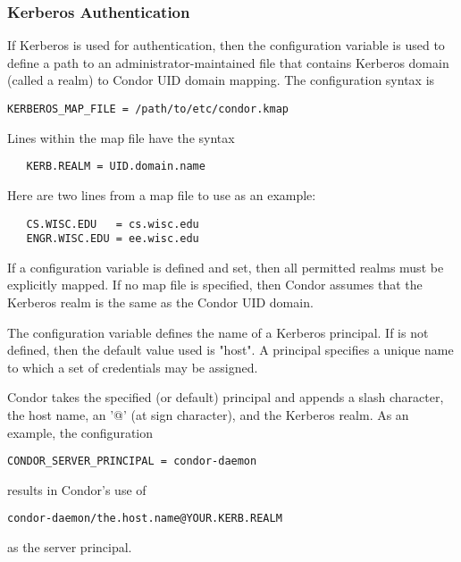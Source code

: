 \subsubsection{\label{sec:Kerberos-Authentication}Kerberos Authentication}
If Kerberos is used for authentication, then 
the configuration variable
is used to define a path to an administrator-maintained file that
contains Kerberos domain (called a realm) to Condor UID domain mapping.
The configuration syntax is
\begin{verbatim}
KERBEROS_MAP_FILE = /path/to/etc/condor.kmap
\end{verbatim}

Lines within the map file have the syntax
\begin{verbatim}
   KERB.REALM = UID.domain.name
\end{verbatim}

Here are two lines from a map file to use as an example:
\begin{verbatim}
   CS.WISC.EDU   = cs.wisc.edu
   ENGR.WISC.EDU = ee.wisc.edu
\end{verbatim}

If a 
configuration variable is defined and set,
then all permitted realms must be explicitly mapped.
If no map file is specified, then Condor assumes that the
Kerberos realm is the same as the Condor UID domain.

The configuration variable
defines the name of a Kerberos principal.
If  is not defined,
then the default value used is "host".
A principal specifies a unique name to which a set of credentials
may be assigned.

Condor takes the specified (or default) principal and appends
a slash character, the host name, an '@' (at sign character),
and the Kerberos realm.
As an example, the configuration
\begin{verbatim}
CONDOR_SERVER_PRINCIPAL = condor-daemon
\end{verbatim}
results in Condor's use of
\begin{verbatim}
condor-daemon/the.host.name@YOUR.KERB.REALM
\end{verbatim}
as the server principal.

